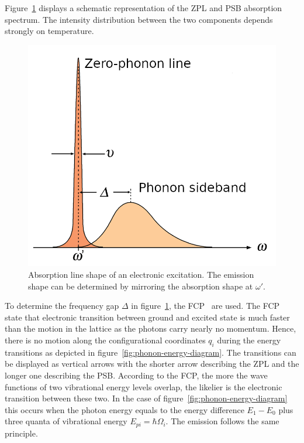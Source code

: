 Figure~\ref{fig:line-shape} displays a schematic representation of the \ac{ZPL} and \ac{PSB} absorption spectrum.
The intensity distribution between the two components depends strongly on temperature.
\begin{figure}[H]
	\centering
	\includegraphics[width=0.5\linewidth]{figures/quantum-dot/Line-shape}
	\caption[Absorption line shape of an electronic excitation.]{Absorption line shape of an electronic excitation.
		The emission shape can be determined by mirroring the absorption shape at $\omega'$.}
	\label{fig:line-shape}
\end{figure}
To determine the frequency gap $\Delta$ in figure~\ref{fig:line-shape}, the \ac{FCP}~\cite{franck_elementary_1926} are used.
The \ac{FCP} state that electronic transition between ground and excited state is much faster than the motion in the lattice as the photons carry nearly no momentum.
Hence, there is no motion along the configurational coordinates $q_i$ during the energy transitions as depicted in figure~\ref{fig:phonon-energy-diagram}.
The transitions can be displayed as vertical arrows with the shorter arrow describing the \ac{ZPL} and the longer one describing the \ac{PSB}.
According to the \ac{FCP}, the more the wave functions of two vibrational energy levels overlap, the likelier is the electronic transition between these two.
In the case of figure~\ref{fig:phonon-energy-diagram} this occurs when the photon energy equals to the energy difference $E_1-E_0$ plus three quanta of vibrational energy $E_{pi} = \hbar \Omega_i$.
The emission follows the same principle.
